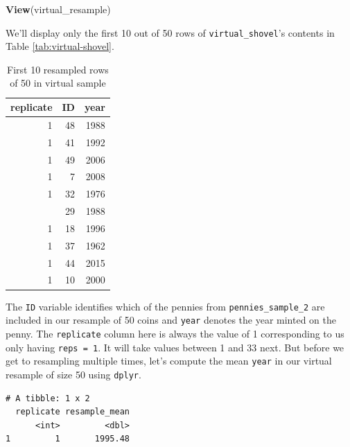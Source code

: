 \documentclass[12pt, krantz2,]{krantz}
\makeatletter
\newenvironment{Shaded}{\begin{snugshade}}{\end{snugshade}}
\newcommand{\DataTypeTok}[1]{\textcolor[rgb]{0.27,0.27,0.27}{#1}}
\newcommand{\KeywordTok}[1]{\textcolor[rgb]{0.27,0.27,0.27}{\textbf{#1}}}
\newcommand{\NormalTok}[1]{#1}
\newcommand{\OperatorTok}[1]{\textcolor[rgb]{0.43,0.43,0.43}{\textbf{#1}}}
\newcommand{\StringTok}[1]{\textcolor[rgb]{0.5,0.5,0.5}{#1}}
\newenvironment{kframe}{%
\medskip{}
\setlength{\fboxsep}{.8em}
 \def\at@end@of@kframe{}%
 \ifinner\ifhmode%
  \def\at@end@of@kframe{\end{minipage}}%
  \begin{minipage}{\columnwidth}%
 \fi\fi%
 \def\FrameCommand##1{\hskip\@totalleftmargin \hskip-\fboxsep
 \colorbox{shadecolor}{##1}\hskip-\fboxsep
     \hskip-\linewidth \hskip-\@totalleftmargin \hskip\columnwidth}%
 \MakeFramed {\advance\hsize-\width
   \@totalleftmargin\z@ \linewidth\hsize
   \@setminipage}}%
 {\par\unskip\endMakeFramed%
 \at@end@of@kframe}
\renewenvironment{Shaded}{\begin{kframe}}{\end{kframe}}
\makeatother
\begin{document}
\begin{Shaded}
\begin{Highlighting}[]
\KeywordTok{View}\NormalTok{(virtual_resample)}
\end{Highlighting}
\end{Shaded}

We'll display only the first 10 out of 50 rows of \texttt{virtual\_shovel}'s contents in Table \ref{tab:virtual-shovel}.

\begin{table}[H]

\caption{\label{tab:virtual-resample}First 10 resampled rows of 50 in virtual sample}
\centering
\fontsize{10}{12}\selectfont
\begin{tabular}{rrr}
\toprule
replicate & ID & year\\
\midrule
1 & 48 & 1988\\
1 & 41 & 1992\\
1 & 49 & 2006\\
1 & 7 & 2008\\
1 & 32 & 1976\\
\addlinespace
1 & 29 & 1988\\
1 & 18 & 1996\\
1 & 37 & 1962\\
1 & 44 & 2015\\
1 & 10 & 2000\\
\bottomrule
\end{tabular}
\end{table}

The \texttt{ID} variable identifies which of the pennies from \texttt{pennies\_sample\_2} are included in our resample of 50 coins and \texttt{year} denotes the year minted on the penny. The \texttt{replicate} column here is always the value of 1 corresponding to us only having \texttt{reps\ =\ 1}. It will take values between 1 and 33 next. But before we get to resampling multiple times, let's compute the mean \texttt{year} in our virtual resample of size 50 using \texttt{dplyr}.

\begin{Shaded}
\end{Shaded}

\begin{verbatim}
# A tibble: 1 x 2
  replicate resample_mean
      <int>         <dbl>
1         1       1995.48
\end{verbatim}
\end{document}
